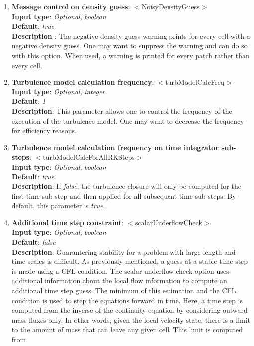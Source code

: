 \begin{enumerate}
\item {\bf  Message control on density guess}: $<$NoisyDensityGuess$>$ \\
{\bf Input type}: {\it Optional, boolean} \\
{\bf Default}: {\it true} \\
{\bf Description }: The negative density guess warning prints for every cell with a negative density guess.  One may want to suppress the warning and can do so with this option.  When used, a warning is printed for every patch rather than every cell.  
\item {\bf Turbulence model calculation frequency}: $<$turbModelCalcFreq$>$ \\
{\bf Input type}: {\it Optional, integer} \\
{\bf Default}: {\it 1} \\ 
{\bf Description}: This parameter allows one to control the frequency of the execution of the turbulence model.  One may want to decrease the frequency for efficiency reasons.  
\item {\bf Turbulence model calculation frequency on time integrator sub-steps}: \newline $<$turbModelCalcForAllRKSteps$>$ \\
{\bf Input type}: {\it Optional, boolean} \\
{\bf Default}: {\it true } \\ 
{\bf Description}: If {\it false}, the turbulence closure will only be computed for the first time sub-step and then applied for all subsequent time sub-steps.  By default, this parameter is {\it true}.  
\item {\bf Additional time step constraint}: $<$scalarUnderflowCheck$>$ \\
{\bf Input type}: {\it Optional, boolean} \\
{\bf Default}: {\it false}   \\ 
{\bf Description}: Guaranteeing stability for a problem with large length and time scales is difficult.  As previously mentioned, a guess at a stable time step is made using a CFL condition.  The scalar underflow check option uses additional information about the local flow information to compute an additional time step guess.  The minimum of this estimation and the CFL condition is used to step the equations forward in time.  Here, a time step is computed from the inverse of the continuity equation by considering outward mass fluxes only.  In other words, given the local velocity state, there is a limit to the amount of mass that can leave any given cell.  This limit is computed from

\end{enumerate}
